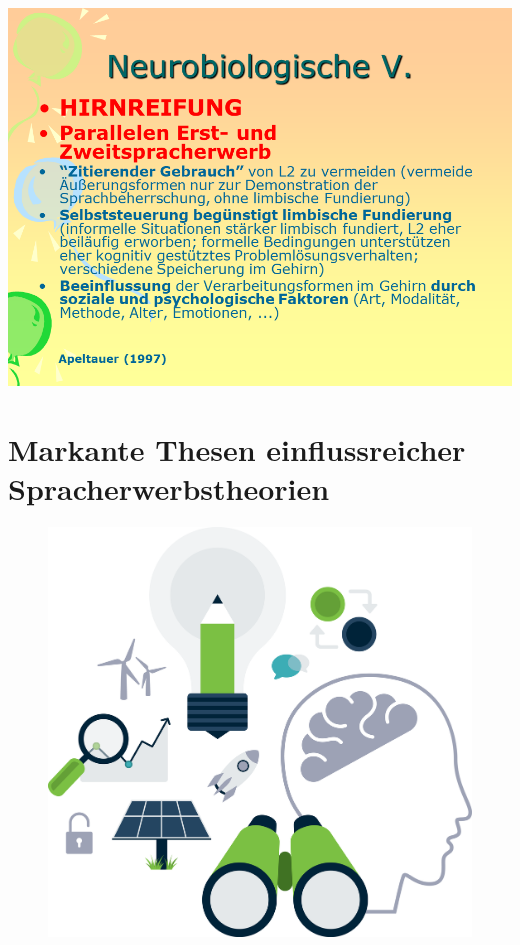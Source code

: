 \documentclass[
  letterpaper,
]{scrbook}
\begin{document}
\includegraphics[width=1\textwidth,height=\textheight]{./pictures/neuro/Diapozitiv92.PNG}

\hypertarget{section-1}{%
\section{}\label{section-1}}

\hypertarget{sec-theorien}{%
\chapter{Markante Thesen einflussreicher
Spracherwerbstheorien}\label{sec-theorien}}

\begin{figure}

{\centering 

\href{https://www.clipartmax.com/middle/m2K9A0m2i8Z5A0i8_more-technology-icon-png/}{\includegraphics[width=1\textwidth,height=\textheight]{./pictures/clipart10912.png}}

}

\end{figure}
\end{document}
